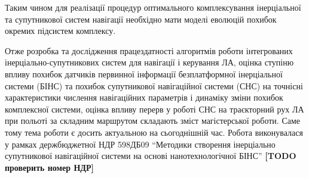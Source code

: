 Таким чином для реалізації процедур оптимального 
комплексування  інерціальної та супутникової систем навігації 
необхідно мати моделі еволюцій похибок окремих підсистем комплексу.

Отже розробка та дослідження працездатності алгоритмів роботи інтегрованих 
інерціально-супутникових систем для навігації і керування ЛА, оцінка 
ступіню впливу похибок датчиків первинної інформації безплатформної 
інерціальної системи (БІНС) та похибок супутникової навігаційної системи 
(СНС) на точнісні характеристики числення навігаційних параметрів і динаміку 
зміни похибок комплексної системи, оцінка впливу перерв у роботі СНС на 
траєкторний рух ЛА при польоті за складним маршрутом складають зміст 
магістерської роботи. Саме тому тема роботи є досить актуальною на 
сьогоднішній час. Робота виконувалася у рамках держбюджетної 
НДР 598ДБ09 ``Методики створення інерціально супутникової навігаційної
системи на основі нанотехнологічної БІНС”
 \textbf{[TODO проверить номер НДР]}